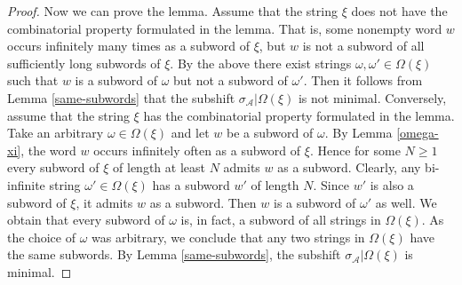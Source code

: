 \documentclass[12pt]{article}
\theoremstyle{definition}
\def\cA{\mathcal{A}}
\def\om{\omega}
\def\si{\sigma}
\def\Om{\Omega}
\begin{document}
\begin{proof}
Now we can prove the lemma.  Assume that the string $\xi$ does not have the 
combinatorial property formulated in the lemma.  That is, some nonempty 
word $w$ occurs infinitely many times as a subword of $\xi$, but $w$ is not 
a subword of all sufficiently long subwords of $\xi$.  By the above there 
exist strings $\om,\om'\in\Om(\xi)$ such that $w$ is a subword of $\om$ but 
not a subword of $\om'$.  Then it follows from Lemma \ref{same-subwords} 
that the subshift $\si_{\cA}|\Om(\xi)$ is not minimal.  Conversely, assume 
that the string $\xi$ has the combinatorial property formulated in the 
lemma.  Take an arbitrary $\om\in\Om(\xi)$ and let $w$ be a subword of 
$\om$.  By Lemma \ref{omega-xi}, the word $w$ occurs infinitely often as a 
subword of $\xi$.  Hence for some $N\ge1$ every subword of $\xi$ of length 
at least $N$ admits $w$ as a subword.  Clearly, any bi-infinite string 
$\om'\in\Om(\xi)$ has a subword $w'$ of length $N$.  Since $w'$ is also a 
subword of $\xi$, it admits $w$ as a subword.  Then $w$ is a subword of 
$\om'$ as well.  We obtain that every subword of $\om$ is, in fact, a 
subword of all strings in $\Om(\xi)$.  As the choice of $\om$ was 
arbitrary, we conclude that any two strings in $\Om(\xi)$ have the same 
subwords.  By Lemma \ref{same-subwords}, the subshift $\si_{\cA}|\Om(\xi)$ 
is minimal.
\end{proof}
\end{document}

